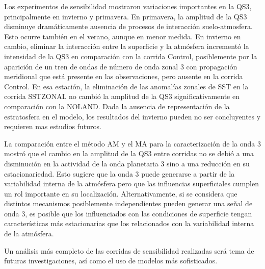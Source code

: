 \documentclass[spanish,a4paper,12pt,oneside]{book}
\begin{document}
Los experimentos de sensibilidad mostraron variaciones importantes en la
QS3, principalmente en invierno y primavera. En primavera, la amplitud
de la QS3 disminuye dramáticamente ausencia de procesos de interacción
suelo-atmosfera. Esto ocurre también en el verano, aunque en menor
medida. En invierno en cambio, eliminar la interacción entre la
superficie y la atmósfera incrementó la intensidad de la QS3 en
comparación con la corrida Control, posiblemente por la aparición de un
tren de ondas de número de onda zonal 3 con propagación meridional que
está presente en las observaciones, pero ausente en la corrida Control.
En esa estación, la eliminación de las anomalías zonales de SST en la
corrida SSTZONAL no cambió la amplitud de la QS3 significativamente en
comparación con la NOLAND. Dada la ausencia de representación de la
estratosfera en el modelo, los resultados del invierno pueden no ser
concluyentes y requieren mas estudios futuros.

La comparación entre el método AM y el MA para la caracterización de la
onda 3 mostró que el cambio en la amplitud de la QS3 entre corridas no
se debió a una disminución en la actividad de la onda planetaria 3 sino
a una reducción en su estacionariedad. Esto sugiere que la onda 3 puede
generarse a partir de la variabilidad interna de la atmósfera pero que
las influencias superficiales cumplen un rol importante en su
localización. Alternativamente, si se considera que distintos mecanismos
posiblemente independientes pueden generar una señal de onda 3, es
posible que los influenciados con las condiciones de superficie tengan
características más estacionarias que los relacionados con la
variabilidad interna de la atmósfera.

Un análisis más completo de las corridas de sensibilidad realizadas será
tema de futuras investigaciones, así como el uso de modelos más
sofisticados.

\renewcommand\bibname{Referencias}

\end{document}
